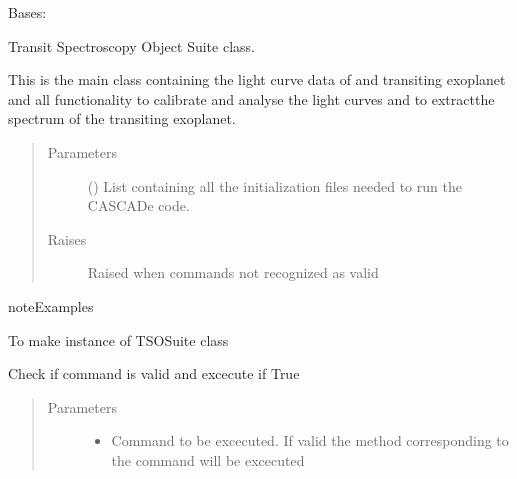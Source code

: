\documentclass[a4paper,10pt,english]{sphinxmanual}
\begin{document}
\begin{fulllineitems}
\label{\detokenize{cascade.TSO:cascade.TSO.TSO.TSOSuite}}
Bases: 

Transit Spectroscopy Object Suite class.

This is the main class containing the light curve data of and transiting
exoplanet and all functionality to calibrate and analyse the light curves
and to extractthe spectrum of the transiting exoplanet.
\begin{quote}\begin{description}
\item[{Parameters}] \leavevmode
{} () \textendash{} List containing all the initialization files needed to run the
CASCADe code.

\item[{Raises}] \leavevmode
{} \textendash{} Raised when commands not recognized as valid

\end{description}\end{quote}

\begin{sphinxadmonition}{note}{Examples}

To make instance of TSOSuite class

%
\begin{sphinxVerbatim}[commandchars=\\\{\}]
  
\end{sphinxVerbatim}
\end{sphinxadmonition}

\begin{fulllineitems}
\label{\detokenize{cascade.TSO:cascade.TSO.TSO.TSOSuite.execute}}
Check if command is valid and excecute if True
\begin{quote}\begin{description}
\item[{Parameters}] \leavevmode\begin{itemize}
\item {} 
 \textendash{} Command to be excecuted. If valid the method corresponding
to the command will be excecuted


\end{itemize}
\end{description}
\end{quote}
\end{fulllineitems}
\end{fulllineitems}
\end{document}
